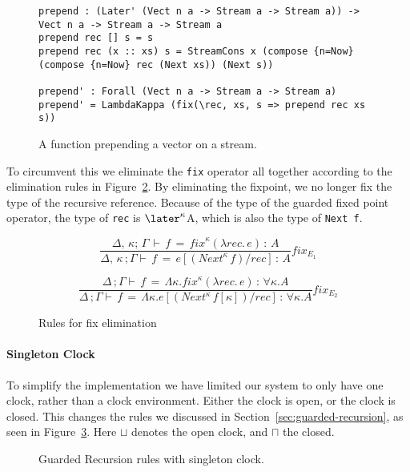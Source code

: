 \begin{figure}[h]
\begin{lstlisting}[mathescape]
prepend : (Later' (Vect n a -> Stream a -> Stream a)) -> Vect n a -> Stream a -> Stream a
prepend rec [] s = s 
prepend rec (x :: xs) s = StreamCons x (compose {n=Now} (compose {n=Now} rec (Next xs)) (Next s))

prepend' : Forall (Vect n a -> Stream a -> Stream a)
prepend' = LambdaKappa (fix(\rec, xs, s => prepend rec xs s))
\end{lstlisting}
  \caption{A function prepending a vector on a stream.}
  \label{fig:guarded_prepend}
\end{figure}

To circumvent this we eliminate the \texttt{fix} operator all together according
to the elimination rules in Figure~\ref{fig:fix_elim_rules}. By eliminating the
fixpoint, we no longer fix the type of the recursive reference. Because of the
type of the guarded fixed point operator, the type of \texttt{rec} is
$\later^{\kappa}$A, which is also the type of \texttt{Next f}.

\begin{figure}[h]
  \[
\frac { \Delta ,\, \kappa ; \, \Gamma \, \vdash \, f\, =\, { fix }^{ \kappa  }(\lambda
  rec.\, e)\, :\, A }{ \Delta ,\, \kappa \, ; \Gamma \vdash \, f\, =\, e[{ (Next^{ \kappa
    }\, f) }/{ rec }]\, :\, A } fix_{E_1}
\]

\[
\frac { \Delta \, ; \Gamma \vdash \, f\, =\, \Lambda \kappa .{ fix }^{ \kappa  }(\lambda
  rec.\, e)\, :\, \forall \kappa .A }{ \Delta \, ; \Gamma \vdash \, f\, =\, \Lambda
  \kappa .e[{ (Next^{ \kappa  }\, f[\kappa ]) }/{ rec }]\, :\, \forall \kappa .A
} fix_{E_2}
\]
  \caption{Rules for fix elimination}
  \label{fig:fix_elim_rules}
\end{figure}

\paragraph{Singleton Clock}
To simplify the implementation we have limited our system to only have one
clock, rather than a clock environment. Either the clock is open, or the clock
is closed. This changes the rules we discussed in
Section~\ref{sec:guarded-recursion}, as seen in
Figure~\ref{fig:gr_rules_sin_clock}. Here
$\sqcup$ denotes the open clock, and $\sqcap$ the closed. 

\begin{figure}[h]
  
  \caption{Guarded Recursion rules with singleton clock.}
  \label{fig:gr_rules_sin_clock}
\end{figure}

